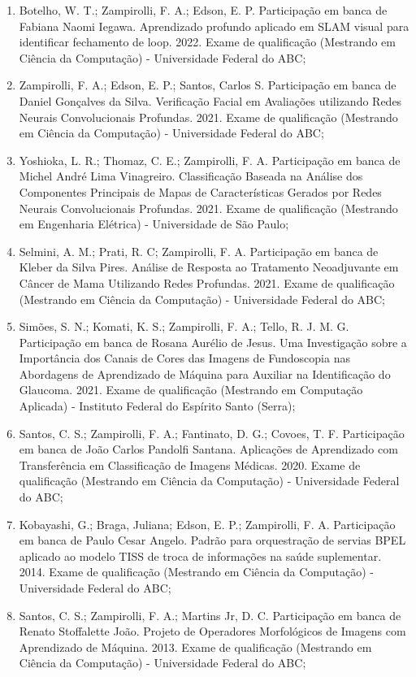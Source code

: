 \begin{enumerate}
    \item Botelho, W. T.; Zampirolli, F. A.; Edson, E. P. Participação em banca de Fabiana Naomi Iegawa. Aprendizado profundo aplicado em SLAM visual para identificar fechamento de loop. 2022. Exame de qualificação (Mestrando em Ciência da Computação) - Universidade Federal do ABC;
    \item Zampirolli, F. A.; Edson, E. P.; Santos, Carlos S. Participação em banca de Daniel Gonçalves da Silva. Verificação Facial em Avaliações utilizando Redes Neurais Convolucionais Profundas. 2021. Exame de qualificação (Mestrando em Ciência da Computação) - Universidade Federal do ABC;
    \item Yoshioka, L. R.; Thomaz, C. E.; Zampirolli, F. A. Participação em banca de Michel André Lima Vinagreiro. Classificação Baseada na Análise dos Componentes Principais de Mapas de Características Gerados por Redes Neurais Convolucionais Profundas. 2021. Exame de qualificação (Mestrando em Engenharia Elétrica) - Universidade de São Paulo;
    \item Selmini, A. M.; Prati, R. C; Zampirolli, F. A. Participação em banca de Kleber da Silva Pires. Análise de Resposta ao Tratamento Neoadjuvante em Câncer de Mama Utilizando Redes Profundas. 2021. Exame de qualificação (Mestrando em Ciência da Computação) - Universidade Federal do ABC;
    \item Simões, S. N.; Komati, K. S.; Zampirolli, F. A.; Tello, R. J. M. G. Participação em banca de Rosana Aurélio de Jesus. Uma Investigação sobre a Importância dos Canais de Cores das Imagens de Fundoscopia nas Abordagens de Aprendizado de Máquina para Auxiliar na Identificação do Glaucoma. 2021. Exame de qualificação (Mestrando em Computação Aplicada) - Instituto Federal do Espírito Santo (Serra);
    \item Santos, C. S.; Zampirolli, F. A.; Fantinato, D. G.; Covoes, T. F. Participação em banca de João Carlos Pandolfi Santana. Aplicações de Aprendizado com Transferência em Classificação de Imagens Médicas. 2020. Exame de qualificação (Mestrando em Ciência da Computação) - Universidade Federal do ABC;
    \item Kobayashi, G.; Braga, Juliana; Edson, E. P.; Zampirolli, F. A. Participação em banca de Paulo Cesar Angelo. Padrão para orquestração de servias BPEL aplicado ao modelo TISS de troca de informações na saúde suplementar. 2014. Exame de qualificação (Mestrando em Ciência da Computação) - Universidade Federal do ABC;
    \item Santos, C. S.; Zampirolli, F. A.; Martins Jr, D. C. Participação em banca de Renato Stoffalette João. Projeto de Operadores Morfológicos de Imagens com Aprendizado de Máquina. 2013. Exame de qualificação (Mestrando em Ciência da Computação) - Universidade Federal do ABC;

\end{enumerate}
